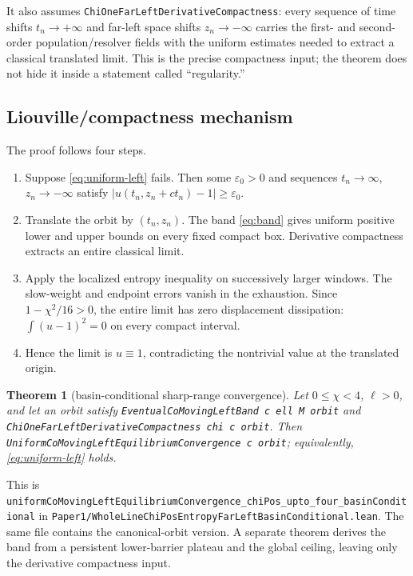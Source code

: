 \documentclass[11pt]{article}
\newcommand{\abs}[1]{\left\lvert #1\right\rvert}
\newcommand{\code}[1]{\nolinkurl{#1}}
\newtheorem{theorem}{Theorem}
\begin{document}
It also assumes \code{ChiOneFarLeftDerivativeCompactness}: every sequence of
time shifts \(t_n\to+\infty\) and far-left space shifts \(z_n\to-\infty\)
carries the first- and second-order population/resolver fields with the
uniform estimates needed to extract a classical translated limit.  This is
the precise compactness input; the theorem does not hide it inside a
statement called ``regularity.''

\subsection{Liouville/compactness mechanism}

The proof follows four steps.
\begin{enumerate}[leftmargin=2em]
\item Suppose \eqref{eq:uniform-left} fails.  Then some
  \(\varepsilon_0>0\) and sequences \(t_n\to\infty\),
  \(z_n\to-\infty\) satisfy
  \(\abs{u(t_n,z_n+ct_n)-1}\ge\varepsilon_0\).
\item Translate the orbit by \((t_n,z_n)\).  The band
  \eqref{eq:band} gives uniform positive lower and upper bounds on every
  fixed compact box.  Derivative compactness extracts an entire classical
  limit.
\item Apply the localized entropy inequality on successively larger windows.
  The slow-weight and endpoint errors vanish in the exhaustion.  Since
  \(1-\chi^2/16>0\), the entire limit has zero displacement dissipation:
  \(\int (u-1)^2=0\) on every compact interval.
\item Hence the limit is \(u\equiv1\), contradicting the nontrivial value at
  the translated origin.
\end{enumerate}

\begin{theorem}[basin-conditional sharp-range convergence]
Let \(0\le\chi<4\), \(\ell>0\), and let an orbit satisfy
\code{EventualCoMovingLeftBand c ell M orbit} and
\code{ChiOneFarLeftDerivativeCompactness chi c orbit}.  Then
\code{UniformCoMovingLeftEquilibriumConvergence c orbit}; equivalently,
\eqref{eq:uniform-left} holds.
\end{theorem}

\noindent This is
\code{uniformCoMovingLeftEquilibriumConvergence_chiPos_upto_four_basinConditional}
in
\code{Paper1/WholeLineChiPosEntropyFarLeftBasinConditional.lean}.  The same
file contains the canonical-orbit version.  A separate theorem derives the
band from a persistent lower-barrier plateau and the global ceiling, leaving
only the derivative compactness input.
\end{document}
